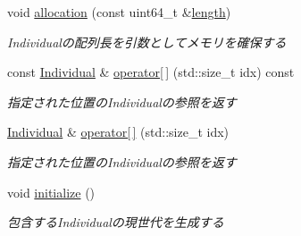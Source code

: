 \begin{DoxyCompactItemize}
void \mbox{\hyperlink{class_g_a_1_1_population_af054c634ff6cff4b3187649f9c4e7357}{allocation}} (const uint64\+\_\+t \&\mbox{\hyperlink{class_g_a_1_1_population_a33cbabc8b461b7d0486dba2c064ee005}{length}})
\begin{DoxyCompactList}\small\item\em Individualの配列長を引数としてメモリを確保する \end{DoxyCompactList}\item 
\mbox{\label{class_g_a_1_1_population_a46544410b015c010b0d37fabb7bdcfc5}} 
const \mbox{\hyperlink{class_g_a_1_1_individual}{Individual}} \& \mbox{\hyperlink{class_g_a_1_1_population_a46544410b015c010b0d37fabb7bdcfc5}{operator\mbox{[}$\,$\mbox{]}}} (std\+::size\+\_\+t idx) const
\begin{DoxyCompactList}\small\item\em 指定された位置の\+Individualの参照を返す \end{DoxyCompactList}\item 
\mbox{\label{class_g_a_1_1_population_a852598da7700c4f2598aba5b7f0d9bcf}} 
\mbox{\hyperlink{class_g_a_1_1_individual}{Individual}} \& \mbox{\hyperlink{class_g_a_1_1_population_a852598da7700c4f2598aba5b7f0d9bcf}{operator\mbox{[}$\,$\mbox{]}}} (std\+::size\+\_\+t idx)
\begin{DoxyCompactList}\small\item\em 指定された位置の\+Individualの参照を返す \end{DoxyCompactList}\item 
\mbox{\label{class_g_a_1_1_population_a97ec98c0cb6fdc4661a02c0b41850b7f}} 
void \mbox{\hyperlink{class_g_a_1_1_population_a97ec98c0cb6fdc4661a02c0b41850b7f}{initialize}} ()
\begin{DoxyCompactList}\small\item\em 包含する\+Individualの現世代を生成する \end{DoxyCompactList}\end{DoxyCompactItemize}
